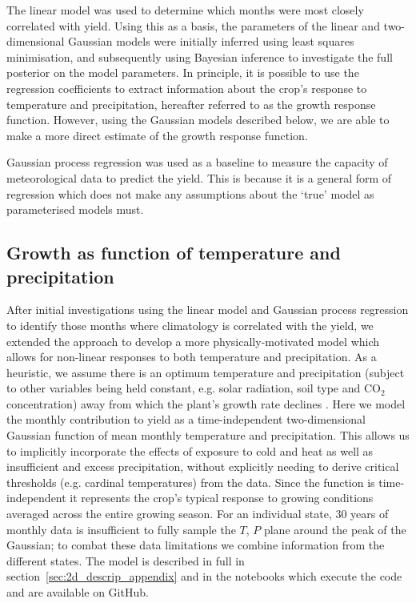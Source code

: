 \documentclass[12pt]{article}
\begin{document}
The linear model was used to determine which months were most closely correlated with yield. Using this as a basis, the parameters of the linear and two-dimensional Gaussian models were initially inferred using least squares minimisation, and subsequently using Bayesian inference to investigate the full posterior on the model parameters. In principle, it is possible to use the regression coefficients to extract information about the crop's response to temperature and precipitation, hereafter referred to as the growth response function. However, using the Gaussian models described below, we are able to make a more direct estimate of the growth response function.

Gaussian process regression was used as a baseline to measure the capacity of meteorological data to predict the yield. This is because it is a general form of regression which does not make any assumptions about the `true' model as parameterised models must. 


\subsection{Growth as function of temperature and precipitation}

After initial investigations using the linear model and Gaussian process regression to identify those months where climatology is correlated with the yield, we extended the approach to develop a more physically-motivated model which allows for non-linear responses to both temperature and precipitation. As a heuristic, we assume there is an optimum temperature and precipitation (subject to other variables being held constant, e.g. solar radiation, soil type and CO$_{2}$ concentration) away from which the plant's growth rate declines \citep[c.f.][]{cutforth:1990, yin:1995, wang:1998, hatfield:2015, korres:2016, tigchelaar:2018}. Here we model the monthly contribution to yield as a time-independent two-dimensional Gaussian function of mean monthly temperature and precipitation. This allows us to implicitly incorporate the effects of exposure to cold and heat as well as insufficient and excess precipitation, without explicitly needing to derive critical thresholds (e.g. cardinal temperatures) from the data. Since the function is time-independent it represents the crop's typical response to growing conditions averaged across the entire growing season. For an individual state, 30 years of monthly data is insufficient to fully sample the $T$, $P$ plane around the peak of the Gaussian; to combat these data limitations we combine information from the different states. The model is described in full in section~\ref{sec:2d_descrip_appendix} and in the notebooks which execute the code and are available on GitHub.
\end{document}
